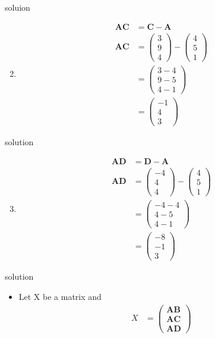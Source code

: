 \documentclass{beamer}
\let\vec\mathbf
\newcommand{\myvec}[1]{\ensuremath{\begin{pmatrix}#1\end{pmatrix}}}
\begin{document}
 
 \begin{frame}{soluion}
 \begin{enumerate}
 \setcounter{enumi}{1}
 \item 
 \begin{align}
     \vec{AC} & = \vec{C}-\vec{A}\\
     \vec{AC} & = \myvec{3\\9\\4}-\myvec{4\\5\\1}\nonumber\\
              & = \myvec{3-4\\9-5\\4-1}\nonumber\\
              & = \myvec{-1\\4\\3}
 \end{align}
 \end{enumerate}
 \end{frame}
 
 
 \begin{frame}{solution}
 \begin{enumerate}
 \setcounter{enumi}{2}
 \item 
 \begin{align}
     \vec{AD} & = \vec{D}-\vec{A}\\
     \vec{AD} & = \myvec{-4\\4\\4}-\myvec{4\\5\\1}\nonumber\\
              & = \myvec{-4-4\\4-5\\4-1}\nonumber\\
              & = \myvec{-8\\-1\\3}
 \end{align}
 \end{enumerate}
 \end{frame}
 
 \begin{frame}{solution}
 \begin{itemize}
\item 
Let X be a matrix and
\begin{align}
    X & = \myvec{\vec{AB}\\\vec{AC}\\\vec{AD}}
\end{align}
\end{itemize}
\end{frame}
 
\end{document}
